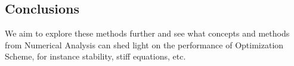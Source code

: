 \documentclass[a0,portrait]{a0poster}
\begin{document}
\begin{multicols}{3}

\color{Navy} %

\section*{Conclusions}
We aim to explore these methods further and see what concepts and methods from Numerical Analysis can shed light on the performance of Optimization Scheme, for instance stability, stiff equations, etc.
\color{Black} %


\nocite{*} %


\end{multicols}
\end{document}
